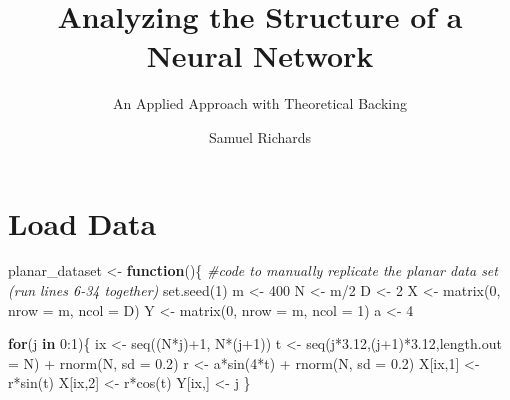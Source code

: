 \documentclass[
]{article}
\title{Analyzing the Structure of a Neural Network}
\subtitle{An Applied Approach with Theoretical Backing}
\author{Samuel Richards}
\date{}
\newenvironment{Shaded}{\begin{snugshade}}{\end{snugshade}}
\newcommand{\AttributeTok}[1]{\textcolor[rgb]{0.77,0.63,0.00}{#1}}
\newcommand{\CommentTok}[1]{\textcolor[rgb]{0.56,0.35,0.01}{\textit{#1}}}
\newcommand{\ControlFlowTok}[1]{\textcolor[rgb]{0.13,0.29,0.53}{\textbf{#1}}}
\newcommand{\DecValTok}[1]{\textcolor[rgb]{0.00,0.00,0.81}{#1}}
\newcommand{\FloatTok}[1]{\textcolor[rgb]{0.00,0.00,0.81}{#1}}
\newcommand{\FunctionTok}[1]{\textcolor[rgb]{0.00,0.00,0.00}{#1}}
\newcommand{\NormalTok}[1]{#1}
\newcommand{\OtherTok}[1]{\textcolor[rgb]{0.56,0.35,0.01}{#1}}
\newcommand{\SpecialCharTok}[1]{\textcolor[rgb]{0.00,0.00,0.00}{#1}}
\begin{document}
\maketitle

\hypertarget{load-data}{%
\section{Load Data}\label{load-data}}

\begin{Shaded}
\begin{Highlighting}[]
\NormalTok{planar\_dataset }\OtherTok{\textless{}{-}} \ControlFlowTok{function}\NormalTok{()\{   }\CommentTok{\#code to manually replicate the planar data set (run lines 6{-}34 together)}
  \FunctionTok{set.seed}\NormalTok{(}\DecValTok{1}\NormalTok{)}
\NormalTok{  m }\OtherTok{\textless{}{-}} \DecValTok{400}
\NormalTok{  N }\OtherTok{\textless{}{-}}\NormalTok{ m}\SpecialCharTok{/}\DecValTok{2}
\NormalTok{  D }\OtherTok{\textless{}{-}} \DecValTok{2}
\NormalTok{  X }\OtherTok{\textless{}{-}} \FunctionTok{matrix}\NormalTok{(}\DecValTok{0}\NormalTok{, }\AttributeTok{nrow =}\NormalTok{ m, }\AttributeTok{ncol =}\NormalTok{ D)}
\NormalTok{  Y }\OtherTok{\textless{}{-}} \FunctionTok{matrix}\NormalTok{(}\DecValTok{0}\NormalTok{, }\AttributeTok{nrow =}\NormalTok{ m, }\AttributeTok{ncol =} \DecValTok{1}\NormalTok{)}
\NormalTok{  a }\OtherTok{\textless{}{-}} \DecValTok{4}
  
  \ControlFlowTok{for}\NormalTok{(j }\ControlFlowTok{in} \DecValTok{0}\SpecialCharTok{:}\DecValTok{1}\NormalTok{)\{}
\NormalTok{    ix }\OtherTok{\textless{}{-}} \FunctionTok{seq}\NormalTok{((N}\SpecialCharTok{*}\NormalTok{j)}\SpecialCharTok{+}\DecValTok{1}\NormalTok{, N}\SpecialCharTok{*}\NormalTok{(j}\SpecialCharTok{+}\DecValTok{1}\NormalTok{))}
\NormalTok{    t }\OtherTok{\textless{}{-}} \FunctionTok{seq}\NormalTok{(j}\SpecialCharTok{*}\FloatTok{3.12}\NormalTok{,(j}\SpecialCharTok{+}\DecValTok{1}\NormalTok{)}\SpecialCharTok{*}\FloatTok{3.12}\NormalTok{,}\AttributeTok{length.out =}\NormalTok{ N) }\SpecialCharTok{+} \FunctionTok{rnorm}\NormalTok{(N, }\AttributeTok{sd =} \FloatTok{0.2}\NormalTok{)}
\NormalTok{    r }\OtherTok{\textless{}{-}}\NormalTok{ a}\SpecialCharTok{*}\FunctionTok{sin}\NormalTok{(}\DecValTok{4}\SpecialCharTok{*}\NormalTok{t) }\SpecialCharTok{+} \FunctionTok{rnorm}\NormalTok{(N, }\AttributeTok{sd =} \FloatTok{0.2}\NormalTok{)}
\NormalTok{    X[ix,}\DecValTok{1}\NormalTok{] }\OtherTok{\textless{}{-}}\NormalTok{ r}\SpecialCharTok{*}\FunctionTok{sin}\NormalTok{(t)}
\NormalTok{    X[ix,}\DecValTok{2}\NormalTok{] }\OtherTok{\textless{}{-}}\NormalTok{ r}\SpecialCharTok{*}\FunctionTok{cos}\NormalTok{(t)}
\NormalTok{    Y[ix,] }\OtherTok{\textless{}{-}}\NormalTok{ j}
\NormalTok{  \}}
  

\end{Highlighting}
\end{Shaded}
\end{document}
